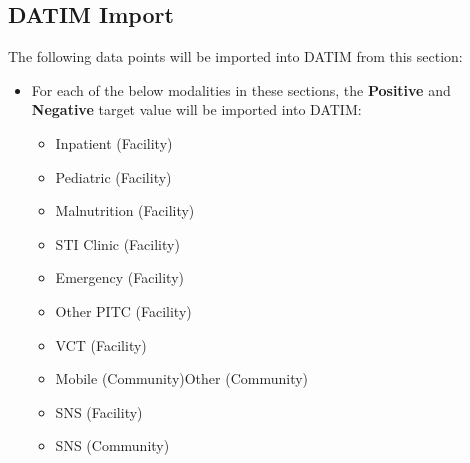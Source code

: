 \documentclass[
  openany]{book}
\begin{document}
\begin{table}
\centering\begingroup\fontsize{12}{14}\selectfont

\endgroup{}
\end{table}

\hypertarget{datim-import-44}{%
\subsection{DATIM Import}\label{datim-import-44}}

The following data points will be imported into DATIM from this section:

\begin{itemize}
\item
  For each of the below modalities in these sections, the \textbf{Positive} and \textbf{Negative} target value will be imported into DATIM:

  \begin{itemize}
  \item
    Inpatient (Facility)
  \item
    Pediatric (Facility)
  \item
    Malnutrition (Facility)
  \item
    STI Clinic (Facility)
  \item
    Emergency (Facility)
  \item
    Other PITC (Facility)
  \item
    VCT (Facility)
  \item
    Mobile (Community)Other (Community)
  \item
    SNS (Facility)
  \item
    SNS (Community)
  \end{itemize}
\end{itemize}
\end{document}
